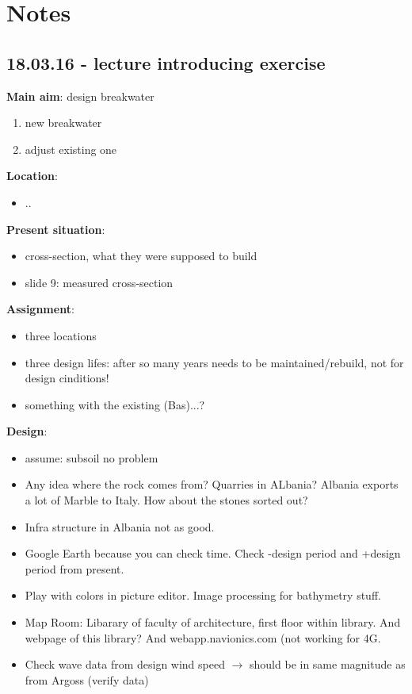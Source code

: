\chapter{Notes}

\section{18.03.16 - lecture introducing exercise}

\textbf{Main aim}: design breakwater
\begin{enumerate}
 \item new breakwater
 \item adjust existing one
\end{enumerate}

\textbf{Location}:
\begin{itemize}
 \item ..
\end{itemize}

\textbf{Present situation}:
\begin{itemize}
 \item cross-section, what they were supposed to build
 \item slide 9: measured cross-section
\end{itemize}

\textbf{Assignment}:
\begin{itemize}
 \item three locations
 \item three design lifes: after so many years needs to be maintained/rebuild, not for design cinditions!
 \item something with the existing (Bas)...?
\end{itemize}

\textbf{Design}:
\begin{itemize}
 \item assume: subsoil no problem
 \item Any idea where the rock comes from? Quarries in ALbania? Albania exports a lot of Marble to Italy. How about the stones sorted out?
 \item Infra structure in Albania not as good.
 \item Google Earth because you can check time. Check -design period and +design period from present.
 \item Play with colors in picture editor. Image processing for bathymetry stuff.
 \item Map Room: Libarary of faculty of architecture, first floor within library. And webpage of this library? And webapp.navionics.com (not working for 4G.
 \item Check wave data from design wind speed $\rightarrow$ should be in same magnitude as from Argoss (verify data)
\end{itemize}

